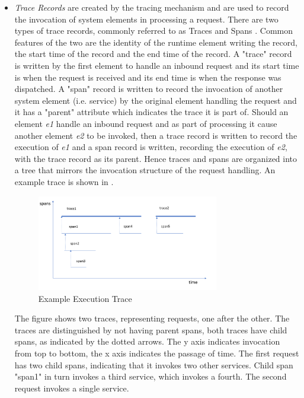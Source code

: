 \begin{itemize}

\item \emph{Trace Records} are created by the tracing mechanism and are used to record the invocation of system elements in processing a request.  There are two types of trace records, commonly referred to as Traces and Spans \cite{opentracing2018-traces}.  Common features of the two are the identity of the runtime element writing the record, the start time of the record and the end time of the record.  A "trace" record is written by the first element to handle an inbound request and its start time is when the request is received and its end time is when the response was dispatched.  A "span" record is written to record the invocation of another system element (i.e. service) by the original element handling the request and it has a "parent" attribute which indicates the trace it is part of.  Should an element \emph{e1} handle an inbound request and as part of processing it cause another element \emph{e2} to be invoked, then a trace record is written to record the execution of \emph{e1} and a span record is written, recording the execution of \emph{e2}, with the trace record as its parent.  Hence traces and spans are organized into a tree that mirrors the invocation structure of the request handling.  An example trace is shown in .

\begin{figure}
\centering
\includegraphics[width=0.75\textwidth]{Figures/estimating-energy-trace}
\caption{Example Execution Trace}
\label{figure:span}
\end{figure}

The figure shows two traces, representing requests, one after the other.  The traces are distinguished by not having parent spans, both traces have child spans, as indicated by the dotted arrows.  The y axis indicates invocation from top to bottom, the x axis indicates the passage of time.  The first request has two child spans, indicating that it invokes two other services.  Child span "span1" in turn invokes a third service, which invokes a fourth.  The second request invokes a single service.


\end{itemize}
